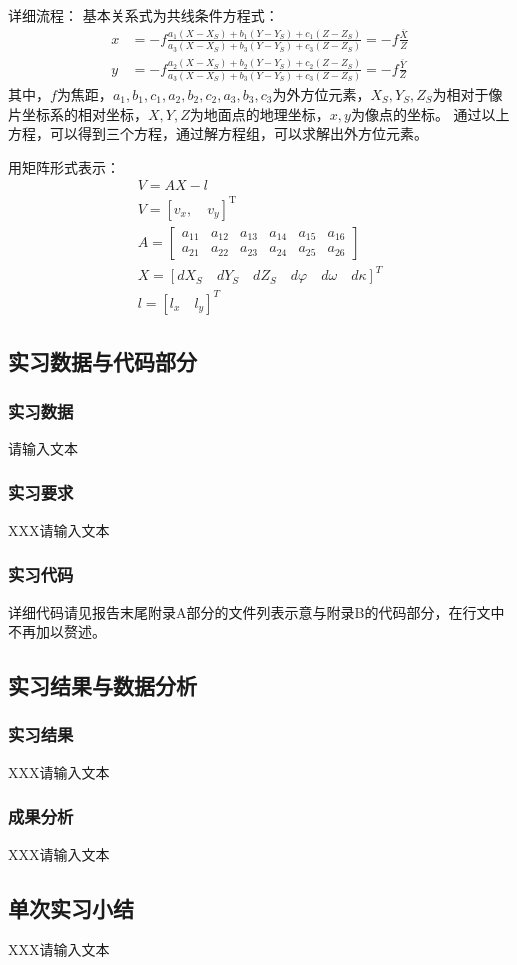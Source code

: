 详细流程：
	基本关系式为共线条件方程式：
    \begin{align*}
        x &= -f \frac{a_1(X - X_S) + b_1(Y - Y_S) + c_1(Z - Z_S)}{a_3(X - X_S) + b_3(Y - Y_S) + c_3(Z - Z_S)} = -f \frac{\overline{X}}{Z} \\
        y &= -f \frac{a_2(X - X_S) + b_2(Y - Y_S) + c_2(Z - Z_S)}{a_3(X - X_S) + b_3(Y - Y_S) + c_3(Z - Z_S)} = -f \frac{\overline{Y}}{Z}
    \end{align*}
    其中，$f$为焦距，$a_1,b_1,c_1,a_2,b_2,c_2,a_3,b_3,c_3$为外方位元素，$X_S,Y_S,Z_S$为相对于像片坐标系的相对坐标，$X,Y,Z$为地面点的地理坐标，$x,y$为像点的坐标。
    通过以上方程，可以得到三个方程，通过解方程组，可以求解出外方位元素。

    用矩阵形式表示：
    \begin{gather*}
        V = AX - l \\
        V = [v_x, \quad v_y]^\text{T} \\
        A = \begin{bmatrix}
            a_{11} & a_{12} & a_{13} & a_{14} & a_{15} & a_{16} \\
            a_{21} & a_{22} & a_{23} & a_{24} & a_{25} & a_{26}
        \end{bmatrix} \\
        X = \left[ dX_S \quad dY_S \quad dZ_S \quad d\varphi \quad d\omega \quad d\kappa \right]^T \\
        l = \left[ l_x \quad l_y \right]^T
    \end{gather*}
    
\subsection{实习数据与代码部分}

\subsubsection{实习数据}    

请输入文本

\subsubsection{实习要求}
XXX请输入文本
\subsubsection{实习代码}
详细代码请见报告末尾附录A部分的文件列表示意与附录B的代码部分，在行文中不再加以赘述。

\subsection{实习结果与数据分析}
\subsubsection{实习结果}
XXX请输入文本


\subsubsection{成果分析}
XXX请输入文本
\subsection{单次实习小结}
XXX请输入文本
